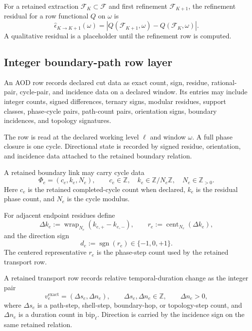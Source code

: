 \begin{definition}
\label{def:refinement-residual}
For a retained extraction \(\mathcal F_K\subset\mathcal F\) and first refinement \(\mathcal F_{K+1}\), the refinement residual for a row functional \(Q\) on \(\omega\) is
\[
\widehat\epsilon_{K\to K+1}(\omega)
=
\left|
Q(\mathcal F_{K+1},\omega)-Q(\mathcal F_K,\omega)
\right|.
\]
A qualitative residual is a placeholder until the refinement row is computed.
\end{definition}

\subsection{Integer boundary-path row layer}


\begin{definition}
\label{def:exact-row-form}
An AOD row records declared cut data as exact count, sign, residue, rational-pair, cycle-pair, and incidence data on a declared window. Its entries may include integer counts, signed differences, ternary signs, modular residues, support classes, phase-cycle pairs, path-count pairs, orientation signs, boundary incidences, and topology signatures.

The row is read at the declared working level \(\ell\) and window \(\omega\). A full phase closure is one cycle. Directional state is recorded by signed residue, orientation, and incidence data attached to the retained boundary relation.
\end{definition}

\begin{definition}
\label{def:cycle-phase-row}
A retained boundary link may carry cycle data
\[
\Phi_e=(c_e,k_e,N_e),
\qquad
c_e\in\mathbb Z,
\quad
k_e\in\mathbb Z/N_e\mathbb Z,
\quad
N_e\in\mathbb Z_{>0}.
\]
Here \(c_e\) is the retained completed-cycle count when declared, \(k_e\) is the residual phase count, and \(N_e\) is the cycle modulus.

For adjacent endpoint residues define
\[
\Delta k_e:=\operatorname{wrap}_{N_e}(k_{e,+}-k_{e,-}),
\qquad
r_e:=\operatorname{cent}_{N_e}(\Delta k_e),
\]
and the direction sign
\[
d_e:=\operatorname{sgn}(r_e)\in\{-1,0,+1\}.
\]
The centered representative \(r_e\) is the phase-step count used by the retained transport row.
\end{definition}

\begin{definition}
\label{def:exact-path-count-ratio}
A retained transport row records relative temporal-duration change as the integer pair
\[
v_e^{\mathrm{exact}}=(\Delta s_e,\Delta n_e),
\qquad
\Delta s_e,\Delta n_e\in\mathbb Z,
\qquad
\Delta n_e>0,
\]
where \(\Delta s_e\) is a path-step, shell-step, boundary-hop, or topology-step count, and \(\Delta n_e\) is a duration count in \(\mathrm{bip}_{\ell}\). Direction is carried by the incidence sign on the same retained relation.
\end{definition}

